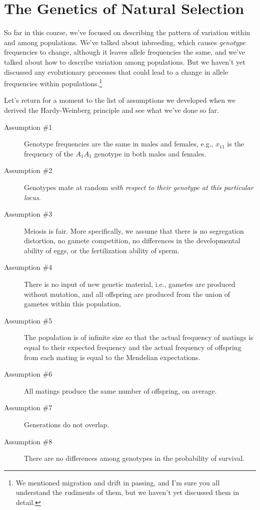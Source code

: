 \chapter{The Genetics of Natural Selection}

So far in this course, we've focused on describing the pattern of
variation within and among populations. We've talked about inbreeding,
which causes {\it genotype\/} frequencies to change, although it
leaves allele frequencies the same, and we've talked about how to
describe variation among populations. But we haven't yet discussed any
evolutionary processes that could lead to a change in allele
frequencies within populations.\footnote{We mentioned migration and
  drift in passing, and I'm sure you all understand the rudiments of
  them, but we haven't yet discussed them in detail.}

Let's return for a moment to the list of assumptions we developed when
we derived the Hardy-Weinberg principle and see what we've done so
far.

\begin{description}

\item[Assumption \#1] Genotype frequencies are the same in males and
females, e.g., $x_{11}$ is the frequency of the $A_1A_1$ genotype in
both males and females.

\item[Assumption \#2] Genotypes mate at random {\it with respect to
their genotype at this particular locus}.

\item[Assumption \#3] Meiosis is fair. More specifically, we assume
that there is no segregation distortion, no gamete competition, no
differences in the developmental ability of eggs, or the fertilization
ability of sperm.

\item[Assumption \#4] There is no input of new genetic material, i.e.,
gametes are produced without mutation, and all offspring are produced
from the union of gametes within this population.

\item[Assumption \#5] The population is of infinite size so that the
actual frequency of matings is equal to their expected frequency and
the actual frequency of offspring from each mating is equal to the
Mendelian expectations.

\item[Assumption \#6] All matings produce the same number of
offspring, on average.

\item[Assumption \#7] Generations do not overlap.

\item[Assumption \#8] There are no differences among genotypes in the
probability of survival.

\end{description}

